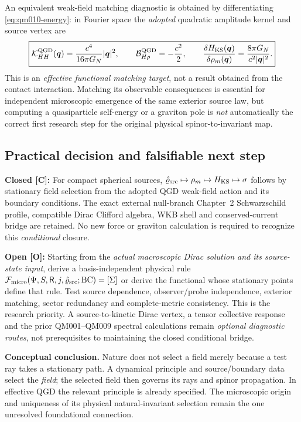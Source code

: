\documentclass[11pt,a4paper]{article}
\begin{document}
An equivalent weak-field matching diagnostic is obtained by differentiating \eqref{eq:qm010-energy}: in Fourier space the \emph{adopted} quadratic amplitude kernel and source vertex are
\begin{equation}\label{eq:qm010-kernel-target}
\boxed{\mathcal K_{HH}^{\rm QGD}(\bm q)
=\frac{c^4}{16\pi G_N}|\bm q|^2,
\qquad\mathcal B_{H\rho}^{\rm QGD}=-\frac{c^2}{2},\qquad
\frac{\delta H_{\rm KS}(\bm q)}{\delta\rho_m(\bm q)}
=\frac{8\pi G_N}{c^2|\bm q|^2}.}
\end{equation}
This is an \emph{effective functional matching target}, not a result obtained from the contact interaction. Matching its observable consequences is essential for independent microscopic emergence of the same exterior source law, but computing a quasiparticle self-energy or a graviton pole is \emph{not} automatically the correct first research step for the original physical spinor-to-invariant map.

\subsection{Practical decision and falsifiable next step}\label{sec:qm010-decision}
\textbf{Closed [C]:} For compact spherical sources, $\hat\varrho_{\rm src}\mapsto\rho_m\mapsto H_{\rm KS}\mapsto\sigma$ follows by stationary field selection from the adopted QGD weak-field action and its boundary conditions. The exact external null-branch Chapter~2 Schwarzschild profile, compatible Dirac Clifford algebra, WKB shell and conserved-current bridge are retained. No new force or graviton calculation is required to recognize this \emph{conditional} closure.

\textbf{Open [O]:} Starting from the \emph{actual macroscopic Dirac solution and its source-state input}, derive a basis-independent physical rule $\mathcal F_{\rm micro}(\Psi,S,\mathsf R,j,\hat\varrho_{\rm src};\mathrm{BC})=[\Sigma]$ or derive the functional whose stationary points define that rule. Test source dependence, observer/probe independence, exterior matching, sector redundancy and complete-metric consistency. This is the research priority. A source-to-kinetic Dirac vertex, a tensor collective response and the prior QM001--QM009 spectral calculations remain \emph{optional diagnostic routes}, not prerequisites to maintaining the closed conditional bridge.

\textbf{Conceptual conclusion.} Nature does not select a field merely because a test ray takes a stationary path. A dynamical principle and source/boundary data select the \emph{field}; the selected field then governs its rays and spinor propagation. In effective QGD the relevant principle is already specified. The microscopic origin and uniqueness of its physical natural-invariant selection remain the one unresolved foundational connection.
\end{document}
